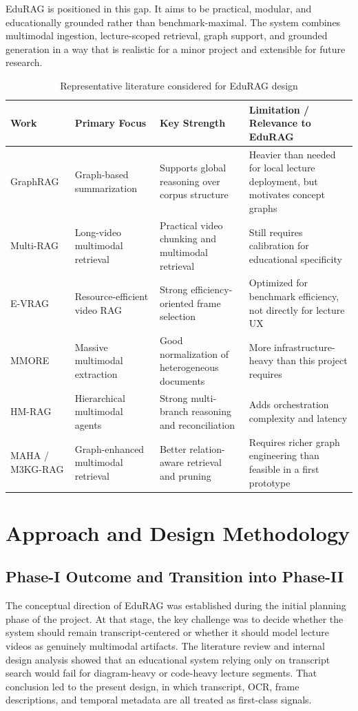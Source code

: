 \documentclass[12pt,a4paper,oneside]{report}
\begin{document}
EduRAG is positioned in this gap. It aims to be practical, modular, and educationally grounded rather than benchmark-maximal. The system combines multimodal ingestion, lecture-scoped retrieval, graph support, and grounded generation in a way that is realistic for a minor project and extensible for future research.

\begin{table}[H]
\centering
\caption{Representative literature considered for EduRAG design}
\label{tab:literature-comparison}
\begin{tabularx}{\textwidth}{p{} p{} p{} X}
\toprule
\textbf{Work} & \textbf{Primary Focus} & \textbf{Key Strength} & \textbf{Limitation / Relevance to EduRAG} \\
\midrule
GraphRAG & Graph-based summarization & Supports global reasoning over corpus structure & Heavier than needed for local lecture deployment, but motivates concept graphs \\
Multi-RAG & Long-video multimodal retrieval & Practical video chunking and multimodal retrieval & Still requires calibration for educational specificity \\
E-VRAG & Resource-efficient video RAG & Strong efficiency-oriented frame selection & Optimized for benchmark efficiency, not directly for lecture UX \\
MMORE & Massive multimodal extraction & Good normalization of heterogeneous documents & More infrastructure-heavy than this project requires \\
HM-RAG & Hierarchical multimodal agents & Strong multi-branch reasoning and reconciliation & Adds orchestration complexity and latency \\
MAHA / M3KG-RAG & Graph-enhanced multimodal retrieval & Better relation-aware retrieval and pruning & Requires richer graph engineering than feasible in a first prototype \\
\bottomrule
\end{tabularx}
\end{table}

\chapter{Approach and Design Methodology}

\section{Phase-I Outcome and Transition into Phase-II}
The conceptual direction of EduRAG was established during the initial planning phase of the project. At that stage, the key challenge was to decide whether the system should remain transcript-centered or whether it should model lecture videos as genuinely multimodal artifacts. The literature review and internal design analysis showed that an educational system relying only on transcript search would fail for diagram-heavy or code-heavy lecture segments. That conclusion led to the present design, in which transcript, OCR, frame descriptions, and temporal metadata are all treated as first-class signals.
\end{document}
